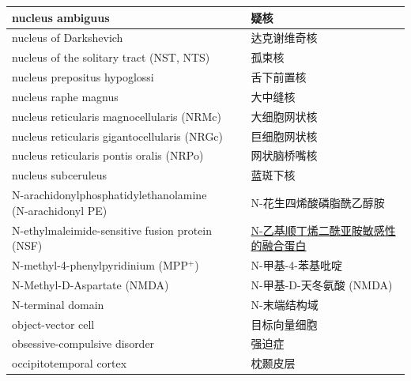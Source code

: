 \begin{longtable}{lll}
	\midrule
	nucleus ambiguus   && 疑核  \\
	
	\midrule
	nucleus of Darkshevich   && 达克谢维奇核  \\
	
	\midrule
	nucleus of the solitary tract (NST, NTS)  && 孤束核  \\
	
	\midrule
	nucleus prepositus hypoglossi   && 舌下前置核  \\
	
	\midrule
	nucleus raphe magnus   && 大中缝核  \\
	
	\midrule
	nucleus reticularis magnocellularis (NRMc)   && 大细胞网状核  \\
	
	\midrule
	nucleus reticularis gigantocellularis (NRGc)   && 巨细胞网状核  \\
	
	\midrule
	nucleus reticularis pontis oralis (NRPo)   && 网状脑桥嘴核  \\
	
	\midrule
	nucleus subceruleus   && 蓝斑下核  \\
	
	\midrule
	\makecell[l]{N-arachidonylphosphatidylethanolamine \\ (N-arachidonyl PE)} && N-花生四烯酸磷脂酰乙醇胺  \\
	
	\midrule
	N-ethylmaleimide-sensitive fusion protein (NSF)  && \href{https://baike.baidu.com/item/NSF/15448963}{N-乙基顺丁烯二酰亚胺敏感性的融合蛋白}  \\
	
	\midrule
	N-methyl-4-phenylpyridinium (MPP$^+$)  && N-甲基-4-苯基吡啶  \\
	
	\midrule
	N-Methyl-D-Aspartate (NMDA)   && N-甲基-D-天冬氨酸 (NMDA)  \\
	
	\midrule
	N-terminal domain   && N-末端结构域  \\
	
	\midrule
	object-vector cell     && 目标向量细胞   \\
	
	\midrule
	obsessive-compulsive disorder     && 强迫症   \\
	
	\midrule
	occipitotemporal cortex     && 枕颞皮层   \\
	

\end{longtable}
